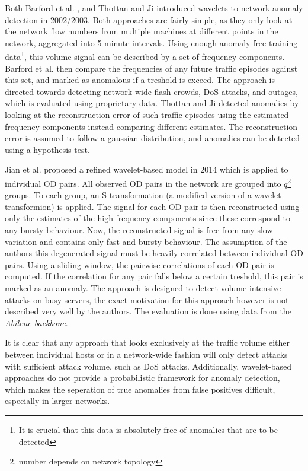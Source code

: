 \documentclass[a4paper,12pt,twoside]{report}
\begin{document}
Both Barford et al. \cite{barford2002signal}, and Thottan and Ji \cite{thottan2003anomaly} introduced wavelets to network anomaly detection in 2002/2003. Both approaches are fairly simple, as they only look at the network flow numbers from multiple machines at different points in the network, aggregated into 5-minute intervals. Using enough anomaly-free training data\footnote{It is crucial that this data is absolutely free of anomalies that are to be detected}, this volume signal can be described by a set of frequency-components. Barford et al. then compare the frequencies of any future traffic episodes against this set, and marked as anomalous if a treshold is exceed. The approach is directed towards detecting network-wide flash crowds, DoS attacks, and outages, which is evaluated using proprietary data. Thottan and Ji detected anomalies by looking at the reconstruction error of such traffic episodes using the estimated frequency-components instead comparing different estimates. The reconstruction error is assumed to follow a gaussian distribution, and anomalies can be detected using a hypothesis test.

Jian et al. \cite{jiang2014transform} proposed a refined wavelet-based model in 2014 which is applied to individual OD pairs. All observed OD pairs in the network are grouped into $q$\footnote{number depends on network topology} groups. To each group, an S-transformation (a modified version of a wavelet-transformion) is applied. The signal for each OD pair is then reconstructed using only the estimates of the high-frequency components since these correspond to any bursty behaviour. Now, the reconstructed signal is free from any slow variation and contains only fast and bursty behaviour. The assumption of the authors this degenerated signal must be heavily correlated between individual OD pairs. Using a sliding window, the pairwise correlations of each OD pair is computed. If the correlation for any pair falls below a certain treshold, this pair is marked as an anomaly. The approach is designed to detect volume-intensive attacks on busy servers, the exact motivation for this approach however is not described very well by the authors. The evaluation is done using data from the \textit{Abilene backbone}.

It is clear that any approach that looks exclusively at the traffic volume either between individual hosts or in a network-wide fashion will only detect attacks with sufficient attack volume, such as DoS attacks. Additionally, wavelet-based approaches do not provide a probabilistic framework for anomaly detection, which makes the seperation of true anomalies from false positives difficult, especially in larger networks. 
\end{document}
